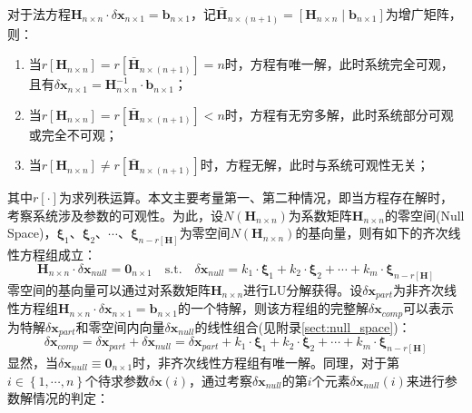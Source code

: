 对于法方程$\boldsymbol{H}_{n\times n}\cdot\delta\boldsymbol{x}_{n\times 1}=\boldsymbol{b}_{n\times 1}$，记$\bar{\boldsymbol{H}}_{n\times (n+1)}=\left[\boldsymbol{H}_{n\times n}\mid \boldsymbol{b}_{n\times 1}\right]$为增广矩阵，则：
\begin{enumerate}
  \item 当$r[\boldsymbol{H}_{n\times n}]=r[\bar{\boldsymbol{H}}_{n\times (n+1)}]=n$时，方程有唯一解，此时系统完全可观，且有$\delta\boldsymbol{x}_{n\times 1}=\boldsymbol{H}^{-1}_{n\times n}\cdot\boldsymbol{b}_{n\times 1}$；

  \item 当$r[\boldsymbol{H}_{n\times n}]=r[\bar{\boldsymbol{H}}_{n\times (n+1)}]<n$时，方程有无穷多解，此时系统部分可观或完全不可观；

  \item 当$r[\boldsymbol{H}_{n\times n}]\ne r[\bar{\boldsymbol{H}}_{n\times (n+1)}]$时，方程无解，此时与系统可观性无关；
\end{enumerate}
其中$r[\cdot]$为求列秩运算。本文主要考量第一、第二种情况，即当方程存在解时，考察系统涉及参数的可观性。为此，设$N(\boldsymbol{H}_{n\times n})$为系数矩阵$\boldsymbol{H}_{n\times n}$的零空间(Null Space)，$\boldsymbol{\xi}_1$、$\boldsymbol{\xi}_2$、$\cdots$、$\boldsymbol{\xi}_{n-r[\boldsymbol{H}]}$为零空间$N(\boldsymbol{H}_{n\times n})$的基向量，则有如下的齐次线性方程组成立：
\begin{equation}
  \boldsymbol{H}_{n\times n}\cdot\delta\boldsymbol{x}_{null}=\boldsymbol{0}_{n\times 1}\quad\mathrm{s.t.}\quad \delta\boldsymbol{x}_{null}=k_1\cdot\boldsymbol{\xi}_1+k_2\cdot\boldsymbol{\xi}_2+\cdots+k_m\cdot\boldsymbol{\xi}_{n-r[\boldsymbol{H}]}
\end{equation}
零空间的基向量可以通过对系数矩阵$\boldsymbol{H}_{n\times n}$进行LU分解获得。设$\delta\boldsymbol{x}_{part}$为非齐次线性方程组$\boldsymbol{H}_{n\times n}\cdot\delta\boldsymbol{x}_{n\times 1}=\boldsymbol{b}_{n\times 1}$的一个特解，则该方程组的完整解$\delta\boldsymbol{x}_{comp}$可以表示为特解$\delta\boldsymbol{x}_{part}$和零空间内向量$\delta\boldsymbol{x}_{null}$的线性组合(见附录\ref{sect:null_space})：
\begin{equation}
  \delta\boldsymbol{x}_{comp}=\delta\boldsymbol{x}_{part}+\delta\boldsymbol{x}_{null}=\delta\boldsymbol{x}_{part}+k_1\cdot\boldsymbol{\xi}_1+k_2\cdot\boldsymbol{\xi}_2+\cdots+k_m\cdot\boldsymbol{\xi}_{n-r[\boldsymbol{H}]}
\end{equation}
显然，当$\delta\boldsymbol{x}_{null}
  \equiv\boldsymbol{0}_{n\times 1}$时，非齐次线性方程组有唯一解。同理，对于第$i\in\left\lbrace 1,\cdots,n\right\rbrace $个待求参数$\delta\boldsymbol{x}(i)$，通过考察$\delta\boldsymbol{x}_{null}$的第$i$个元素$\delta\boldsymbol{x}_{null}(i)$来进行参数解情况的判定：

